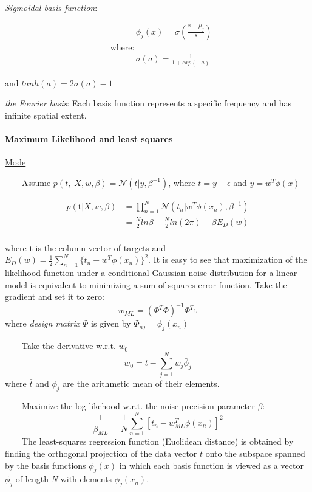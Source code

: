 \documentclass{article}
\newcommand{\tmem}[1]{{\em #1\/}}
\begin{document}
{\tmem{Sigmoidal basis function}}:

\begin{align}
  & \quad \quad \quad \phi_j (x) = \sigma (\frac{x - \mu_j}{s})\\
  & \text{where: }\\
  & \quad \qquad \sigma (a) = \frac{1}{1 + exp (- a)}
\end{align}

and $tanh (a) = 2 \sigma (a) - 1$

{\tmem{the Fourier basis}}: Each basis function represents a specific
frequency and has infinite spatial extent.

\paragraph{Maximum Likelihood and least squares}\label{header-n34}

\href{https://en.wikipedia.org/wiki/Mode_(statistics)}{Mode}

$\quad \quad$Assume $p (t, |X, w, \beta) = \mathcal{N} (t|y, \beta^{- 1})$,
where $t = y + \epsilon$ and $y = w^T \phi (x)$

\begin{align}
  p (\mathrm{t} |X, w, \beta) & = \prod^N_{n = 1} \mathcal{N} (t_n |w^T \phi
  (x_n), \beta^{- 1})\\
  & = \frac{N}{2} ln \beta - \frac{N}{2} ln (2 \pi) - \beta E_D (w)\\
  & 
\end{align}

where $\mathrm{t}$ is the column vector of targets and $E_D (w) = \frac{1}{2}
\sum^N_{n = 1} \{t_n - w^T \phi (x_n)\}^2$. It is easy to see that
maximization of the likelihood function under a conditional Gaussian noise
distribution for a linear model is equivalent to minimizing a sum-of-squares
error function. Take the gradient and set it to zero:
\[ w_{ML} = (\Phi^T \Phi)^{- 1} \Phi^T \mathrm{t} \]
where {\tmem{design matrix}} $\Phi$ is given by $\Phi_{nj} = \phi_j (x_n)$

$\quad \quad$Take the derivative w.r.t. $w_0$
\[ w_0 = \bar{t} - \sum^N_{j = 1} w_j  \bar{\phi}_j \]
where $\bar{t}$ and $\overline{\phi_j}$ are the arithmetic mean of their
elements.

$\quad \quad$Maximize the log likehood w.r.t. the noise precision parameter
$\beta$:
\[ \frac{1}{\beta_{ML}} = \frac{1}{N} \sum^N_{n = 1} [t_n - w^T_{ML} \phi
   (x_n)]^2 \]
$\quad \quad$The least-squares regression function (Euclidean distance) is
obtained by finding the orthogonal projection of the data vector $t$ onto the
subspace spanned by the basis functions $\phi_j (x)$ in which each basis
function is viewed as a vector $\phi_j$ of length {\tmem{N}} with elements
$\phi_j (x_n)$.
\end{document}
